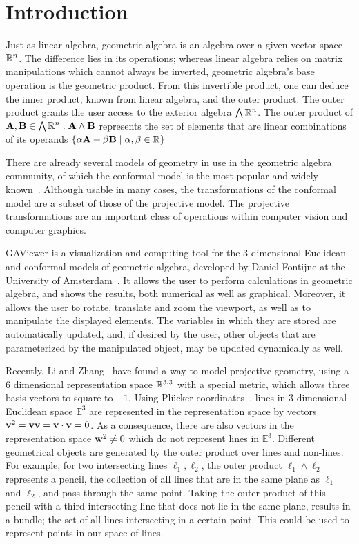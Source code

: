 \section{Introduction}
\label{ch:introduction}

Just as linear algebra, geometric algebra is an algebra over a given vector space $\mathbb{R}^n$.  The difference lies in its operations; whereas linear algebra relies on matrix manipulations which cannot always be inverted, geometric algebra's base operation is the geometric product.  From this invertible product, one can deduce the inner product, known from linear algebra, and the outer product.  The outer product grants the user access to the exterior algebra $\bigwedge \mathbb{R}^n$.  The outer product of $\mathbf{A}, \mathbf{B} \in \bigwedge \mathbb{R}^n: \mathbf{A} \wedge \mathbf{B}$ represents the set of elements that are linear combinations of its operands $\left\{\alpha \mathbf{A} + \beta \mathbf{B} \mid \alpha, \beta \in \mathbb{R} \right\}$

There are already several models of geometry in use in the geometric algebra community, of which the conformal model is the most popular and widely known~\cite{TheBook}.  Although usable in many cases, the transformations of the conformal model are a subset of those of the projective model. The projective transformations are an important class of operations within computer vision and computer graphics. 

GAViewer is a visualization and computing tool for the 3-dimensional Euclidean and conformal models of geometric algebra, developed by Daniel Fontijne at the University of Amsterdam~\cite{GAViewer}.  It allows the user to perform calculations in geometric algebra, and shows the results, both numerical as well as graphical.  Moreover, it allows the user to rotate, translate and zoom the viewport, as well as to manipulate the displayed elements.  The variables in which they are stored are automatically updated, and, if desired by the user, other objects that are parameterized by the manipulated object, may be updated dynamically as well.

Recently, Li and Zhang~\cite{Hongbo} have found a way to model projective geometry, using a 6 dimensional representation space $\mathbb{R}^{3,3}$ with a special metric, which allows three basis vectors to square to $-1$.  Using Pl\"ucker coordinates~\cite{Hongbo,Pottmann2}, lines in 3-dimensional Euclidean space $\mathbb{E}^3$ are represented in the representation space by vectors $\mathbf{v}^2 = \mathbf{v} \mathbf{v} = \mathbf{v} \cdot \mathbf{v} = 0$.  As a consequence, there are also vectors in the representation space $\mathbf{w}^2 \not= 0$ which do not represent lines in $\mathbb{E}^3$.  Different geometrical objects are generated by the outer product over lines and non-lines.  For example, for two intersecting lines $\ell_1, \ell_2$, the outer product $\ell_1 \wedge \ell_2$ represents a pencil, the collection of all lines that are in the same plane as $\ell_1$ and $\ell_2$, and pass through the same point.  Taking the outer product of this pencil with a third intersecting line that does not lie in the same plane, results in a bundle; the set of all lines intersecting in a certain point.  This could be used to represent points in our space of lines.

